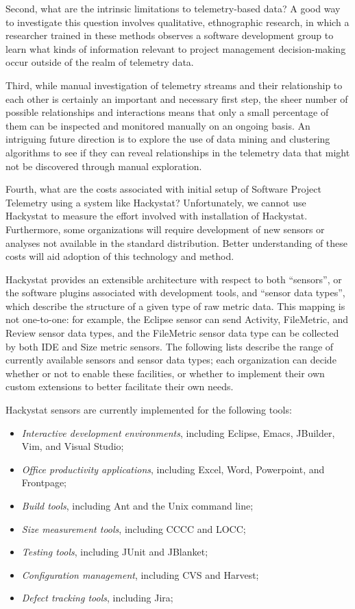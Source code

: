 \documentclass[11pt,twocolumn]{article}
\begin{document}
Second, what are the intrinsic limitations to telemetry-based data?
A good way to investigate this question involves qualitative, ethnographic
research, in which a researcher trained in these methods observes a
software development group to learn what kinds of information relevant to
project management decision-making occur outside of the realm of telemetry
data. 

Third, while manual investigation of telemetry streams and their
relationship to each other is certainly an important and necessary first
step, the sheer number of possible relationships and interactions means
that only a small percentage of them can be inspected and monitored
manually on an ongoing basis.  An intriguing future direction is to explore
the use of data mining and clustering algorithms to see if they can reveal
relationships in the telemetry data that might not be discovered through
manual exploration. 

Fourth, what are the costs associated with initial setup of Software
Project Telemetry using a system like Hackystat? Unfortunately, we cannot
use Hackystat to measure the effort involved with installation of
Hackystat.  Furthermore, some organizations will require development of new
sensors or analyses not available in the standard distribution.  Better
understanding of these costs will aid adoption of this technology and
method.



\label{sec:Sidebar:Sensors}

Hackystat provides an extensible architecture with respect to both
``sensors'', or the software plugins associated with development tools, and
``sensor data types'', which describe the structure of a given type of raw
metric data.  This mapping is not one-to-one: for example, the Eclipse
sensor can send Activity, FileMetric, and Review sensor data types, and the
FileMetric sensor data type can be collected by both IDE and Size metric
sensors.   The following lists describe the range of currently available
sensors and sensor data types; each organization can decide whether or not
to enable these facilities, or whether to implement their own custom
extensions to better facilitate their own needs.

Hackystat sensors are currently implemented for the following tools:
\begin{itemize}
\item {\em Interactive development environments}, including Eclipse, 
Emacs, JBuilder, Vim, and Visual Studio;
\item {\em Office productivity applications}, including Excel, Word,
Powerpoint, and Frontpage;
\item {\em Build tools}, including Ant and the Unix command line;
\item {\em Size measurement tools}, including CCCC and LOCC;
\item {\em Testing tools}, including JUnit and JBlanket;
\item {\em Configuration management}, including CVS and Harvest;
\item {\em Defect tracking tools}, including Jira;
\end{itemize}
\end{document}
